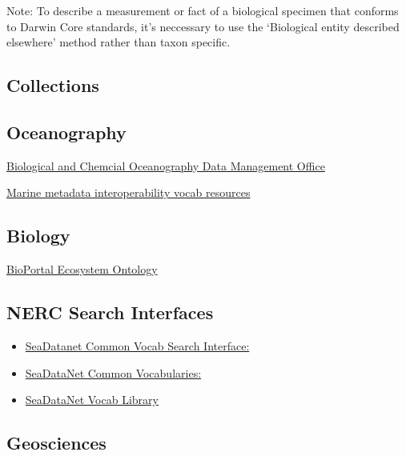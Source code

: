 \documentclass[]{book}
\begin{document}
Note: To describe a measurement or fact of a biological specimen that conforms to Darwin Core standards, it's neccessary to use the `Biological entity described elsewhere' method rather than taxon specific.

\hypertarget{collections}{%
\subsection{Collections}\label{collections}}

\hypertarget{oceanography}{%
\subsection{Oceanography}\label{oceanography}}

\href{http://www.bco-dmo.org/}{Biological and Chemcial Oceanography Data Management Office}

\href{https://mmisw.org/ont/\#/}{Marine metadata interoperability vocab resources}

\hypertarget{biology}{%
\subsection{Biology}\label{biology}}

\href{http://bioportal.bioontology.org/ontologies/ECSO}{BioPortal Ecosystem Ontology}

\hypertarget{nerc-search-interfaces}{%
\subsection{NERC Search Interfaces}\label{nerc-search-interfaces}}

\begin{itemize}
\item
  \href{http://seadatanet.maris2.nl/v_bodc_vocab_v2/welcome.asp}{SeaDatanet Common Vocab Search Interface:}
\item
  \href{https://www.seadatanet.org/Standards/Common-Vocabularies/}{SeaDataNet Common Vocabularies:}
\item
  \href{http://seadatanet.maris2.nl/v_bodc_vocab_v2/vocab_relations.asp?lib=P08}{SeaDataNet Vocab Library}
\end{itemize}

\hypertarget{geosciences}{%
\subsection{Geosciences}\label{geosciences}}
\end{document}
